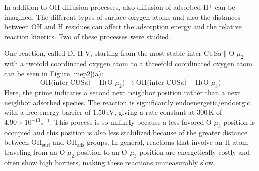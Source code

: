 \documentclass[11pt,DIV=13,BCOR=5mm,a4paper,headinclude]{scrbook}
\begin{document}
In addition to OH diffusion processes, also diffusion of adsorbed H$^+$ can be imagined.
The different types of surface oxygen atoms and also the distances between OH and H residues can affect the adsorption energy and the relative reaction kinetics.
Two of these processes were studied.


One reaction, called Df-H-V, starting from the most stable inter-CUSa$\parallel$O-$\mu_2$ with a twofold coordinated oxygen atom to a threefold coordinated oxygen atom can be seen in Figure \ref{mep2}(a):
\begin{equation}
 \text{OH(inter-CUSa)} + \text{H(O-$\mu_2$)} \rightarrow \text{OH(inter-CUSa)} + \text{H(O-$\mu_3^\prime$)} \tag{Df-H-V}
     \label{diffHV}
\end{equation}
Here, the prime indicates a second next neighbor position rather than a next neighbor adsorbed species.
The reaction is significantly endoenergetic/endoergic with a free energy barrier of $1.50\,$eV, giving a rate constant at $300\,$K of $4.90\times 10^{-13}$s$^{-1}$.
This process is so unlikely because a less favored O-$\mu_3$ position is occupied and this position is also less stabilized because of the greater distance between OH$_{\text{surf}}$ and OH$_{\text{ads}}$ groups.
In general, reactions that involve an H atom traveling from an O-$\mu_2$ position to an O-$\mu_3$ position are energetically costly and often show high barriers, making these reactions unmeasurably slow.
\end{document}
